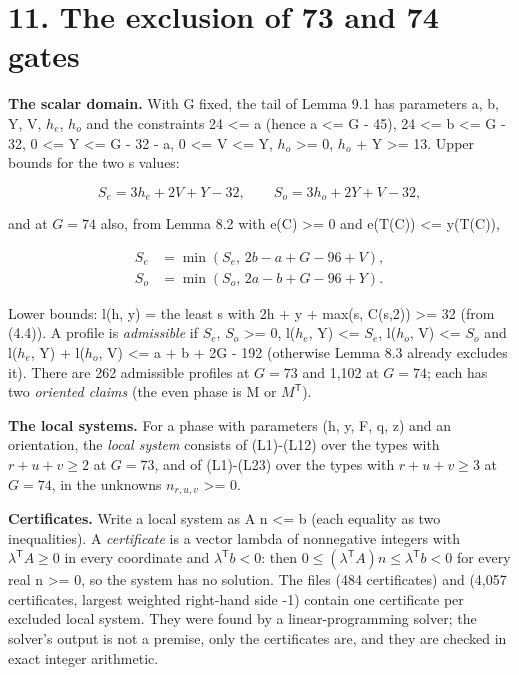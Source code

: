 \hypertarget{the-exclusion-of-73-and-74-gates}{%
\section{11. The exclusion of 73 and 74 gates}\label{the-exclusion-of-73-and-74-gates}}

\textbf{The scalar domain.} With G fixed, the tail of Lemma 9.1 has parameters a, b, Y, V, \(h_e\), \(h_o\) and the constraints 24 \textless= a (hence a \textless= G - 45), 24 \textless= b \textless= G - 32, 0 \textless= Y \textless= G - 32 - a, 0 \textless= V \textless= Y, \(h_o\) \textgreater= 0, \(h_o\) + Y \textgreater= 13. Upper bounds for the two s values:

\[
S_e=3h_e+2V+Y-32,\qquad S_o=3h_o+2Y+V-32,
\]

and at \(G=74\) also, from Lemma 8.2 with e(C) \textgreater= 0 and e(T(C)) \textless= y(T(C)),

\[
\begin{aligned}
S_e&=\min(S_e,\,2b-a+G-96+V),\\
S_o&=\min(S_o,\,2a-b+G-96+Y).
\end{aligned}
\]

Lower bounds: l(h, y) = the least s with 2h + y + max(s, C(s,2)) \textgreater= 32 (from (4.4)). A profile is \emph{admissible} if \(S_e\), \(S_o\) \textgreater= 0, l(\(h_e\), Y) \textless= \(S_e\), l(\(h_o\), V) \textless= \(S_o\) and l(\(h_e\), Y) + l(\(h_o\), V) \textless= a + b + 2G - 192 (otherwise Lemma 8.3 already excludes it). There are 262 admissible profiles at \(G=73\) and 1,102 at \(G=74\); each has two \emph{oriented claims} (the even phase is M or \(M^{\mathsf T}\)).

\textbf{The local systems.} For a phase with parameters (h, y, F, q, z) and an orientation, the \emph{local system} consists of (L1)-(L12) over the types with \(r+u+v\ge2\) at \(G=73\), and of (L1)-(L23) over the types with \(r+u+v\ge3\) at \(G=74\), in the unknowns \(n_{r,u,v}\) \textgreater= 0.

\textbf{Certificates.} Write a local system as A n \textless= b (each equality as two inequalities). A \emph{certificate} is a vector lambda of nonnegative integers with \(\lambda^{\mathsf T}A\ge0\) in every coordinate and \(\lambda^{\mathsf T}b<0\): then \(0\le(\lambda^{\mathsf T}A)n\le\lambda^{\mathsf T}b<0\) for every real n \textgreater= 0, so the system has no solution. The files \texttt{} (484 certificates) and \texttt{} (4,057 certificates, largest weighted right-hand side -1) contain one certificate per excluded local system. They were found by a linear-programming solver; the solver's output is not a premise, only the certificates are, and they are checked in exact integer arithmetic.


